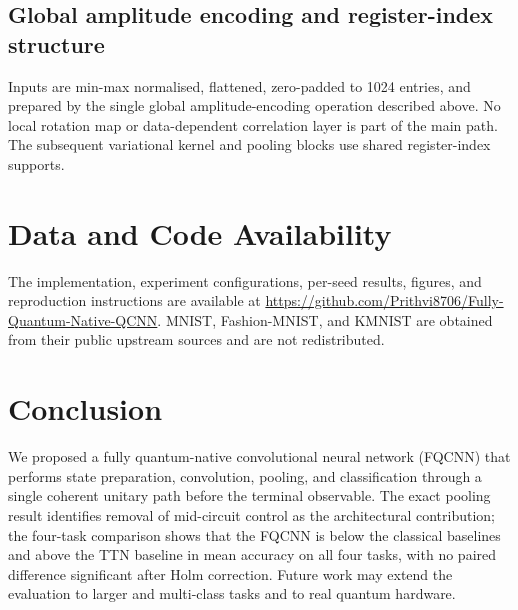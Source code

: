 \documentclass[conference]{IEEEtran}
\begin{document}
\subsection{Global amplitude encoding and register-index structure}
Inputs are min-max normalised, flattened, zero-padded to 1024 entries, and prepared by the single global amplitude-encoding operation described above. No local rotation map or data-dependent correlation layer is part of the main path. The subsequent variational kernel and pooling blocks use shared register-index supports.

\section*{Data and Code Availability}
The implementation, experiment configurations, per-seed results, figures, and
reproduction instructions are available at \url{https://github.com/Prithvi8706/Fully-Quantum-Native-QCNN}.
MNIST, Fashion-MNIST, and KMNIST are obtained from their public upstream
sources and are not redistributed.

\section{Conclusion}
We proposed a fully quantum-native convolutional neural network (FQCNN) that performs state preparation, convolution, pooling, and classification through a single coherent unitary path before the terminal observable. The exact pooling result identifies removal of mid-circuit control as the architectural contribution; the four-task comparison shows that the FQCNN is below the classical baselines and above the TTN baseline in mean accuracy on all four tasks, with no paired difference significant after Holm correction. Future work may extend the evaluation to larger and multi-class tasks and to real quantum hardware.
\end{document}
